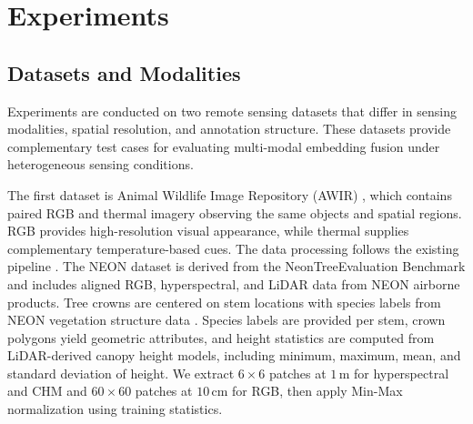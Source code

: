 \documentclass[lettersize,journal]{IEEEtran}
\begin{document}
\section{Experiments}

\subsection{Datasets and Modalities}
\label{subsec:datasets}

Experiments are conducted on two remote sensing datasets that differ in sensing modalities, spatial resolution, and annotation structure. These datasets provide complementary test cases for evaluating multi-modal embedding fusion under heterogeneous sensing conditions.

The first dataset is Animal Wildlife Image Repository (AWIR) \cite{samiappan2024aerial, zhou2025multi}, which contains paired RGB and thermal imagery observing the same objects and spatial regions. RGB provides high-resolution visual appearance, while thermal supplies complementary temperature-based cues. The data processing follows the existing pipeline \cite{zhou2025multi}. The NEON dataset is derived from the NeonTreeEvaluation Benchmark \cite{Weinstein_Marconi_White_2022} and includes aligned RGB, hyperspectral, and LiDAR data from NEON airborne products. Tree crowns are centered on stem locations with species labels from NEON vegetation structure data \cite{NEON_vegetation_structure}. Species labels are provided per stem, crown polygons yield geometric attributes, and height statistics are computed from LiDAR-derived canopy height models, including minimum, maximum, mean, and standard deviation of height. We extract $6\times6$ patches at $1\,\mathrm{m}$ for hyperspectral and CHM and $60\times60$ patches at $10\,\mathrm{cm}$ for RGB, then apply Min-Max normalization using training statistics.
\end{document}
